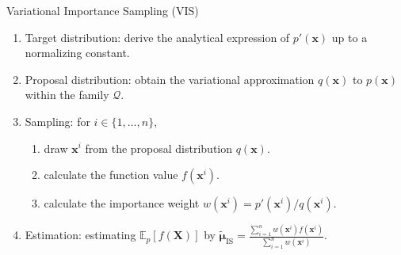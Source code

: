 \documentclass[pdflatex,sn-mathphys-num]{sn-jnl}%
\theoremstyle{thmstyleone}%
\theoremstyle{thmstyletwo}%
\theoremstyle{thmstylethree}%
\begin{document}
\begin{algorithm}
    \caption{Variational Importance Sampling (VIS)}
    \label{alg:variational_is}
    \begin{enumerate}
        \item Target distribution: derive the analytical expression of \(p'(\mathbf{x})\) up to a normalizing constant.
        \item Proposal distribution: obtain the variational approximation \( q(\mathbf{x}) \) to \( p(\mathbf{x}) \) within the family $\mathcal{Q}$.
        \item Sampling: for \( i \in \{1, \dots, n\} \),
        \begin{enumerate}
            \item draw \( \mathbf{x}^{i} \) from the proposal distribution \( q(\mathbf{x}) \).
            \item calculate the function value $f\left(\mathbf{x}^{i}\right)$.
            \item calculate the importance weight \( w\left(\mathbf{x}^{i}\right) = p'\left(\mathbf{x}^{i}\right) / q\left(\mathbf{x}^{i}\right) \).
        \end{enumerate}
        \item Estimation: estimating $\mathbb{E}_{p}[f\left( \mathbf{X} \right)]$ by \( \tilde{\boldsymbol{\mu}}_{\operatorname{IS}}=\frac{\sum_{i=1}^{n}w\left( \mathbf{x}^{i} \right) f\left( \mathbf{x}^{i} \right)}{\sum_{i=1}^n w\left( \mathbf{x}^{i} \right)}\).
    \end{enumerate}
\end{algorithm}
\end{document}
